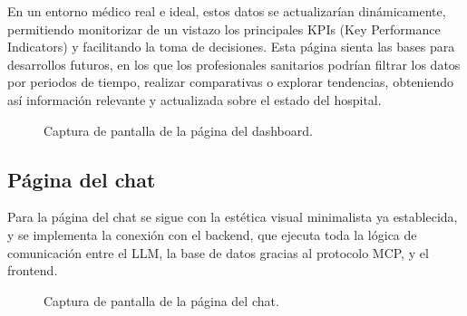 En un entorno médico real e ideal, estos datos se actualizarían dinámicamente, permitiendo monitorizar de un vistazo los principales KPIs (Key Performance Indicators) y facilitando la toma de decisiones. Esta página sienta las bases para desarrollos futuros, en los que los profesionales sanitarios podrían filtrar los datos por periodos de tiempo, realizar comparativas o explorar tendencias, obteniendo así información relevante y actualizada sobre el estado del hospital. 
\begin{figure}[H]
  \centering
  \caption{Captura de pantalla de la página del dashboard.}
  \label{fig:dash}
\end{figure}

\subsection{Página del chat}
Para la página del chat se sigue con la estética visual minimalista ya establecida, y se implementa la conexión con el backend, que ejecuta toda la lógica de comunicación entre el LLM, la base de datos gracias al protocolo MCP, y el frontend.
\begin{figure}[H]
  \centering
  \caption{Captura de pantalla de la página del chat.}
  \label{fig:chat}
\end{figure}

